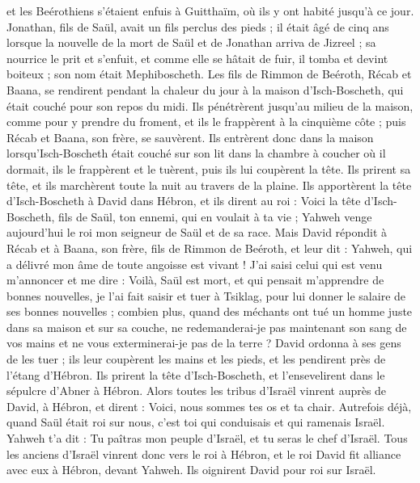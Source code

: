 \begin{multicols}{2}
et les Beérothiens s'étaient enfuis à Guitthaïm, où ils y ont habité jusqu'à ce jour.
Jonathan, fils de Saül, avait un fils perclus des pieds ; il était âgé de cinq ans lorsque la nouvelle de la mort de Saül et de Jonathan arriva de Jizreel ; sa nourrice le prit et s'enfuit, et comme elle se hâtait de fuir, il tomba et devint boiteux ; son nom était Mephiboscheth.
Les fils de Rimmon de Beéroth, Récab et Baana, se rendirent pendant la chaleur du jour à la maison d'Isch-Boscheth, qui était couché pour son repos du midi.
Ils pénétrèrent jusqu'au milieu de la maison, comme pour y prendre du froment, et ils le frappèrent à la cinquième côte ; puis Récab et Baana, son frère, se sauvèrent.
Ils entrèrent donc dans la maison lorsqu’Isch-Boscheth était couché sur son lit dans la chambre à coucher où il dormait, ils le frappèrent et le tuèrent, puis ils lui coupèrent la tête. Ils prirent sa tête, et ils marchèrent toute la nuit au travers de la plaine.
Ils apportèrent la tête d'Isch-Boscheth à David dans Hébron, et ils dirent au roi : Voici la tête d'Isch-Boscheth, fils de Saül, ton ennemi, qui en voulait à ta vie ; Yahweh venge aujourd'hui le roi mon seigneur de Saül et de sa race.
Mais David répondit à Récab et à Baana, son frère, fils de Rimmon de Beéroth, et leur dit : Yahweh, qui a délivré mon âme de toute angoisse est vivant !
J’ai saisi celui qui est venu m’annoncer et me dire : Voilà, Saül est mort, et qui pensait m'apprendre de bonnes nouvelles, je l’ai fait saisir et tuer à Tsiklag, pour lui donner le salaire de ses bonnes nouvelles ;
combien plus, quand des méchants ont tué un homme juste dans sa maison et sur sa couche, ne redemanderai-je pas maintenant son sang de vos mains et ne vous exterminerai-je pas de la terre ?
David ordonna à ses gens de les tuer ; ils leur coupèrent les mains et les pieds, et les pendirent près de l'étang d'Hébron. Ils prirent la tête d'Isch-Boscheth, et l'ensevelirent dans le sépulcre d'Abner à Hébron.
\VerseOne{}Alors toutes les tribus d'Israël vinrent auprès de David, à Hébron, et dirent : Voici, nous sommes tes os et ta chair.
Autrefois déjà, quand Saül était roi sur nous, c’est toi qui conduisais et qui ramenais Israël. Yahweh t'a dit : Tu paîtras mon peuple d'Israël, et tu seras le chef d'Israël.
Tous les anciens d'Israël vinrent donc vers le roi à Hébron, et le roi David fit alliance avec eux à Hébron, devant Yahweh. Ils oignirent David pour roi sur Israël.

\end{multicols}
